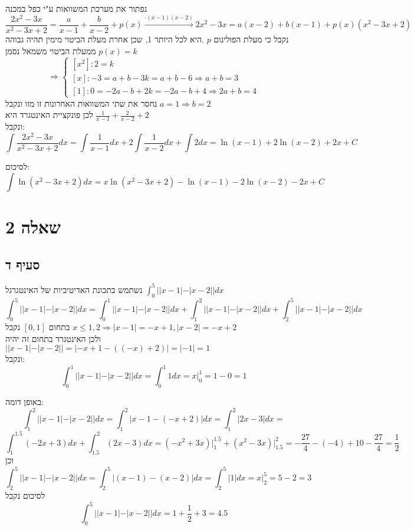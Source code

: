 \documentclass{article}
\begin{document}
נפתור את מערכת המשוואות ע"י כפל במכנה\[
    \frac{2x^2-3x}{x^2-3x+2} = \frac{a}{x-1} + \frac{b}{x-2} + p(x)
    \xrightarrow{\cdot (x-1)(x-2)}
    2x^2-3x=a(x-2)+b(x-1) + p(x)(x^2-3x+2)
\]
נקבל כי מעלת הפולינום $p$ .היא לכל היותר 1, שכן אחרת מעלת הביטוי מימין תהיה גבוהה ממעלת הביטוי משמאל
נסמן $p(x) = k$
\[
    \Rightarrow \begin{cases}
        [x^2]: 2=k                             \\
        [x]: -3=a+b-3k=a+b-6 \Rightarrow a+b=3 \\
        [1]: 0= -2a-b+2k=-2a-b+4 \Rightarrow 2a + b = 4
    \end{cases}
\]
נחסר את שתי המשוואות האחרונות זו מזו ונקבל $a=1\Rightarrow b=2$ \\
לכן פונקציית האינטגרד היא $\frac{1}{x-1} + \frac{2}{x-2} + 2$ \\
ונקבל: \[
    \int \frac{2x^2-3x}{x^2-3x+2}dx =
    \int \frac{1}{x-1}dx + 2 \int \frac{1}{x-2}dx + \int 2dx =
    \ln(x-1) + 2\ln(x-2) + 2x + C
\]

לסיכום: \[
    \int \ln(x^2-3x+2)dx =
    x\ln(x^2-3x+2) - \ln(x-1) -2\ln(x-2) - 2x + C
\]

\pagebreak

\section*{שאלה 2}

\subsection*{סעיף ד}
נשתמש בתכונת האדיטיביות של האינטגרגל $\int_0^5 ||x-1|-|x-2||dx$
\[
    \int_0^5 ||x-1|-|x-2||dx =
    \int_0^1 ||x-1|-|x-2||dx + \int_1^2 ||x-1|-|x-2||dx + \int_2^5 ||x-1|-|x-2||dx
\]
בתחום $[0,1]$ נקבל $x\leq 1,2\Rightarrow |x-1|=-x+1, |x-2|=-x+2$ \\
ולכן האינטגרד בתחום זה יהיה $||x-1|-|x-2||=|-x+1-((-x)+2)|=|-1|=1$ \\
ונקבל: \[
    \int_0^1 ||x-1|-|x-2||dx =
    \int_0^1 1dx =
    x\bigg|_0^1 =
    1 - 0 = 1
\]

באופן דומה: \[
    \int_1^2 ||x-1|-|x-2||dx =
    \int_1^2 |x-1-(-x+2)|dx =
    \int_1^2 |2x-3|dx =
\]
\[
    \int_1^{1.5} (-2x+3)dx + \int_{1.5}^2 (2x-3)dx =
    (-x^2+3x)\bigg|_1^{1.5} + (x^2-3x)\bigg|_{1.5}^2 =
    -\frac{27}{4} - (-4) + 10 - \frac{27}{4} =
    \frac{1}{2}
\]
וכן \[
    \int_2^5 ||x-1|-|x-2||dx =
    \int_2^5 |(x-1)-(x-2)|dx =
    \int_2^5 |1|dx =
    x\bigg|_2^5 =
    5 - 2 = 3
\]
לסיכום נקבל \[
    \int_0^5 ||x-1|-|x-2||dx =
    1 + \frac{1}{2} + 3 =
    4.5
\]
\end{document}
